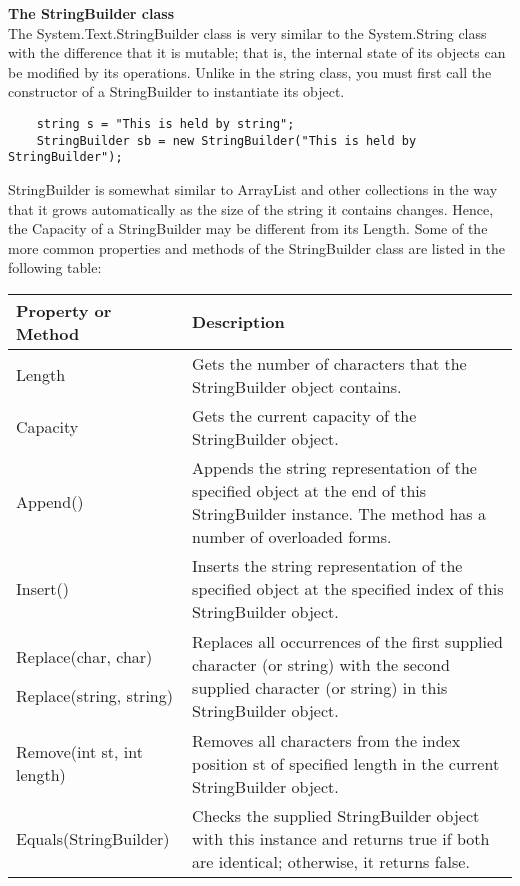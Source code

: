 \textbf{The StringBuilder class}\\

The System.Text.StringBuilder class is very similar to the System.String class with the difference that it is
mutable; that is, the internal state of its objects can be modified by its operations. Unlike in the string class, you
must first call the constructor of a StringBuilder to instantiate its object.

\begin{lstlisting}
    string s = "This is held by string";
    StringBuilder sb = new StringBuilder("This is held by StringBuilder");        
\end{lstlisting}


StringBuilder is somewhat similar to ArrayList and other collections in the way that it grows automatically as the
size of the string it contains changes. Hence, the Capacity of a StringBuilder may be different from its Length.
Some of the more common properties and methods of the StringBuilder class are listed in the following table:

\begin{center}
    \begin{tabular}{ | m{10em} | m{10cm} | } 
    \hline
    Property or Method & Description \\
    \hline
    Length & Gets the number of characters that the StringBuilder object contains.\\
    Capacity & Gets the current capacity of the StringBuilder object.\\
    Append() & Appends the string representation of the specified object at the end of this
    StringBuilder instance. The method has a number of overloaded forms.\\
    Insert() & Inserts the string representation of the specified object at the specified index of
    this StringBuilder object.\\
    Replace(char, char)

    Replace(string, string) & 
    Replaces all occurrences of the first supplied character (or string) with the
    second supplied character (or string) in this StringBuilder object.\\
    Remove(int st, int length) & Removes all characters from the index position st of specified length in the
    current StringBuilder object.\\
    Equals(StringBuilder) & Checks the supplied StringBuilder object with this instance and returns true if
    both are identical; otherwise, it returns false.\\
    \hline
    \end{tabular}
\end{center}

